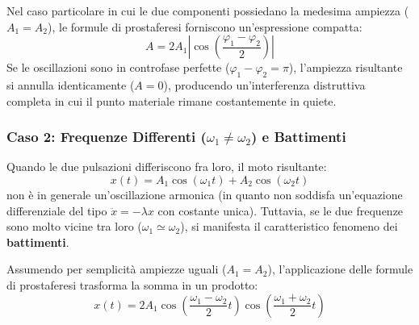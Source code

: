 Nel caso particolare in cui le due componenti possiedano la medesima ampiezza ($A_1 = A_2$), le formule di prostaferesi forniscono un'espressione compatta:
\begin{equation}
    A = 2A_1 \left| \cos\left(\frac{\varphi_1 - \varphi_2}{2}\right) \right|
\end{equation}
Se le oscillazioni sono in controfase perfette ($\varphi_1 - \varphi_2 = \pi$), l'ampiezza risultante si annulla identicamente ($A = 0$), producendo un'interferenza distruttiva completa in cui il punto materiale rimane costantemente in quiete.

\subsubsection{Caso 2: Frequenze Differenti ($\omega_1 \neq \omega_2$) e Battimenti}
Quando le due pulsazioni differiscono fra loro, il moto risultante:
\begin{equation}
    x(t) = A_1 \cos(\omega_1 t) + A_2 \cos(\omega_2 t)
\end{equation}
non è in generale un'oscillazione armonica (in quanto non soddisfa un'equazione differenziale del tipo $\ddot{x} = -\lambda x$ con costante unica). Tuttavia, se le due frequenze sono molto vicine tra loro ($\omega_1 \simeq \omega_2$), si manifesta il caratteristico fenomeno dei \textbf{battimenti}.

Assumendo per semplicità ampiezze uguali ($A_1 = A_2$), l'applicazione delle formule di prostaferesi trasforma la somma in un prodotto:
\begin{equation}
    x(t) = 2A_1 \cos\left( \frac{\omega_1 - \omega_2}{2} t \right) \cos\left( \frac{\omega_1 + \omega_2}{2} t \right)
\end{equation}

